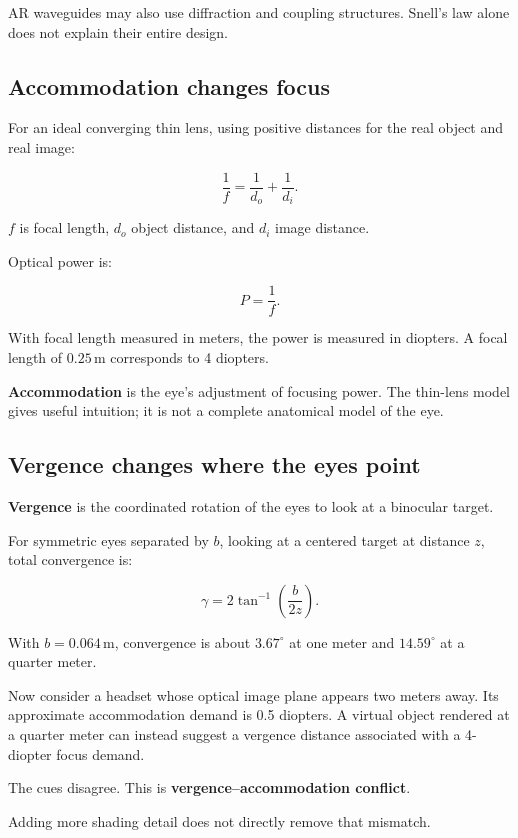AR waveguides may also use diffraction and coupling structures. Snell's law alone does not explain their entire design.

\subsection{Accommodation changes focus}\label{04-visual-computing-ii-ch043-accommodation-changes-focus}

For an ideal converging thin lens, using positive distances for the real object and real image:

\[
\frac1f=\frac1{d_o}+\frac1{d_i}.
\]

\(f\) is focal length, \(d_o\) object distance, and \(d_i\) image distance.

Optical power is:

\[
P=\frac1f.
\]

With focal length measured in meters, the power is measured in diopters. A focal length of \(0.25\,\mathrm{m}\) corresponds to 4 diopters.

\textbf{Accommodation} is the eye's adjustment of focusing power. The thin-lens model gives useful intuition; it is not a complete anatomical model of the eye.

\subsection{Vergence changes where the eyes point}\label{04-visual-computing-ii-ch043-vergence-changes-where-the-eyes-point}

\textbf{Vergence} is the coordinated rotation of the eyes to look at a binocular target.

For symmetric eyes separated by \(b\), looking at a centered target at distance \(z\), total convergence is:

\[
\gamma=2\tan^{-1}\left(\frac{b}{2z}\right).
\]

With \(b=0.064\,\mathrm{m}\), convergence is about \(3.67^\circ\) at one meter and \(14.59^\circ\) at a quarter meter.

Now consider a headset whose optical image plane appears two meters away. Its approximate accommodation demand is 0.5 diopters. A virtual object rendered at a quarter meter can instead suggest a vergence distance associated with a 4-diopter focus demand.

The cues disagree. This is \textbf{vergence--accommodation conflict}.

Adding more shading detail does not directly remove that mismatch.

